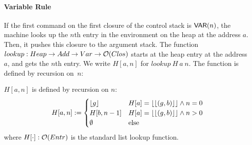 \paragraph{Variable Rule}
If the first command on the first closure of the control stack is $\mathsf{VAR}(n)$, the machine looks up the $n$th entry in the environment on the heap
at the address $a$.  Then, it pushes this closure to the argument stack.  The function $lookup : Heap \rightarrow Add \rightarrow Var \rightarrow \mathcal{O}(Clos)$ starts at the
heap entry at the address $a$, and gets the $n$th entry. We write $H[a,n]$ for $lookup~H~a~n$.  The function is defined by recursion on~$n$:
\begin{definition}[$lookup$][lookup]
  \label{def:lookup}
  $H[a,n]$ is defined by recursion on $n$:
  \[
    H[a,n] :=
    \begin{cases}
      \left\lfloor {g} \right\rfloor & H[a]=\left\lfloor {\left\lfloor {(g,b)} \right\rfloor} \right\rfloor \land n=0 \\
      H[b,n-1] & H[a]=\left\lfloor {\left\lfloor {(g,b)} \right\rfloor} \right\rfloor \land n>0 \\
      \emptyset & \text{else}
    \end{cases}
  \]
  where $H[\cdot] : \mathcal{O}(Entr)$ is the standard list lookup function.
\end{definition}


